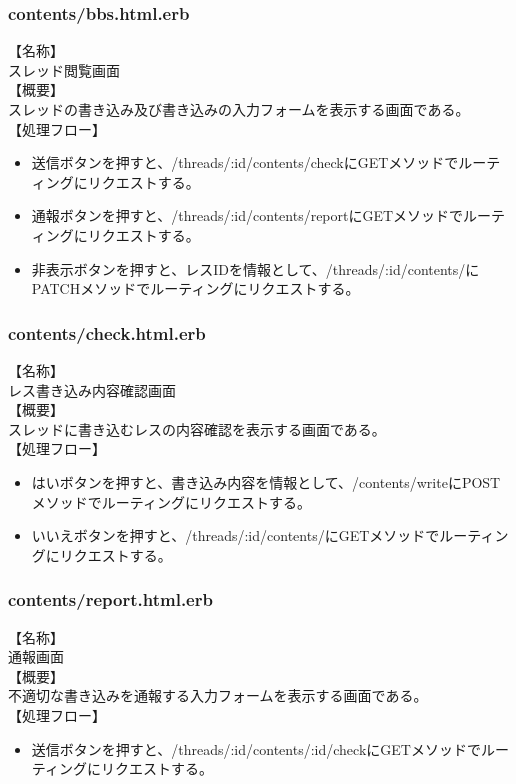 \documentclass[a4j]{jarticle}
\begin{document}
\subsubsection{contents/bbs.html.erb}
\noindent
【名称】\\
スレッド閲覧画面\\
【概要】\\
スレッドの書き込み及び書き込みの入力フォームを表示する画面である。\\
【処理フロー】
\begin{itemize}
  \item 送信ボタンを押すと、/threads/:id/contents/checkにGETメソッドでルーティングにリクエストする。
  \item 通報ボタンを押すと、/threads/:id/contents/reportにGETメソッドでルーティングにリクエストする。
  \item 非表示ボタンを押すと、レスIDを情報として、/threads/:id/contents/にPATCHメソッドでルーティングにリクエストする。
\end{itemize}

\subsubsection{contents/check.html.erb}
\noindent
【名称】\\
レス書き込み内容確認画面\\
【概要】\\
スレッドに書き込むレスの内容確認を表示する画面である。\\
【処理フロー】
\begin{itemize}
  \item はいボタンを押すと、書き込み内容を情報として、/contents/writeにPOSTメソッドでルーティングにリクエストする。
  \item いいえボタンを押すと、/threads/:id/contents/にGETメソッドでルーティングにリクエストする。
\end{itemize}

\subsubsection{contents/report.html.erb}
\noindent
【名称】\\
通報画面\\
【概要】\\
不適切な書き込みを通報する入力フォームを表示する画面である。\\
【処理フロー】
\begin{itemize}
  \item 送信ボタンを押すと、/threads/:id/contents/:id/checkにGETメソッドでルーティングにリクエストする。
\end{itemize}
\end{document}
